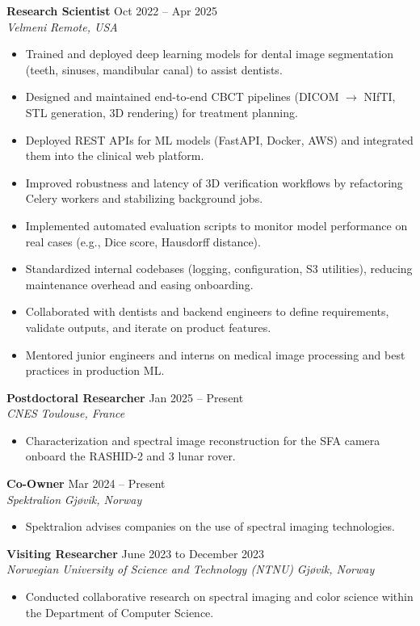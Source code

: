 \documentclass[a4paper,11pt]{article}
\newcommand{\experienceheader}[4]{
    \noindent \textbf{#1} \hfill #2 \\
    \textit{#3} \hfill \textit{#4} \vspace{2pt}
}
\begin{document}
\experienceheader{Research Scientist}{Oct 2022 -- Apr 2025}{Velmeni}{Remote, USA}
\begin{itemize}
    \item Trained and deployed deep learning models for dental image segmentation (teeth, sinuses, mandibular canal) to assist dentists.
    \item Designed and maintained end-to-end CBCT pipelines (DICOM $\rightarrow$ NIfTI, STL generation, 3D rendering) for treatment planning.
    \item Deployed REST APIs for ML models (FastAPI, Docker, AWS) and integrated them into the clinical web platform.
    \item Improved robustness and latency of 3D verification workflows by refactoring Celery workers and stabilizing background jobs.
    \item Implemented automated evaluation scripts to monitor model performance on real cases (e.g., Dice score, Hausdorff distance).
    \item Standardized internal codebases (logging, configuration, S3 utilities), reducing maintenance overhead and easing onboarding.
    \item Collaborated with dentists and backend engineers to define requirements, validate outputs, and iterate on product features.
    \item Mentored junior engineers and interns on medical image processing and best practices in production ML.
\end{itemize}
\vspace{8pt}


\experienceheader{Postdoctoral Researcher}{Jan 2025 -- Present}{CNES}{Toulouse, France}
\begin{itemize}
    \item Characterization and spectral image reconstruction for the SFA camera onboard the RASHID-2 and 3 lunar rover.
\end{itemize}
\vspace{8pt}


\experienceheader{Co-Owner}{Mar 2024 -- Present}{Spektralion}{Gjøvik, Norway}
\begin{itemize}
    \item Spektralion advises companies on the use of spectral imaging technologies.
\end{itemize}
\vspace{8pt}

\experienceheader{Visiting Researcher}{June 2023 to December 2023}{Norwegian University of Science and Technology (NTNU)}{Gjøvik, Norway}
\begin{itemize}
    \item Conducted collaborative research on spectral imaging and color science within the Department of Computer Science.
\end{itemize}
\vspace{8pt}
\end{document}

